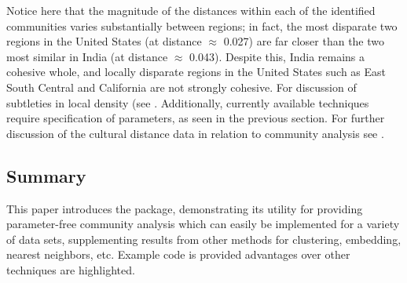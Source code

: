 Notice here that the magnitude of the distances within each of the
identified communities varies substantially between regions; in fact,
the most disparate two regions in the United States (at distance
\(\approx\) 0.027) are far closer than the two most similar in India (at
distance \(\approx\) 0.043). Despite this, India remains a cohesive
whole, and locally disparate regions in the United States such as East
South Central and California are not strongly cohesive. For discussion
of subtleties in local density (see \citet{berenhaut2022social}.
Additionally, currently available techniques require specification of
parameters, as seen in the previous section. For further discussion of
the cultural distance data in relation to community analysis see
\citet{berenhaut2022social}.

\hypertarget{summary}{%
\subsection{Summary}\label{summary}}

This paper introduces the  package, demonstrating its
utility for providing parameter-free community analysis which can easily
be implemented for a variety of data sets, supplementing results from
other methods for clustering, embedding, nearest neighbors, etc. Example
code is provided advantages over other techniques are highlighted.




\address{%
Lucy D'Agostino McGowan\\
Wake Forest University\\%
Winston-Salem, NC\\ 27106\\
%
%
%
\href{mailto:mcgowald@wfu.edu}{\nolinkurl{mcgowald@wfu.edu}}%
}

\address{%
Katherine Moore\\
Amherst College\\%
Amherst, MA\\ 1002\\
%
%
%
\href{mailto:kmoore@amherst.edu}{\nolinkurl{kmoore@amherst.edu}}%
}

\address{%
Kenneth Berenhaut\\
Wake Forest University\\%
Winston-Salem, NC\\ 27106\\
%
%
%
\href{mailto:berenhks@wfu.edu}{\nolinkurl{berenhks@wfu.edu}}%
}
